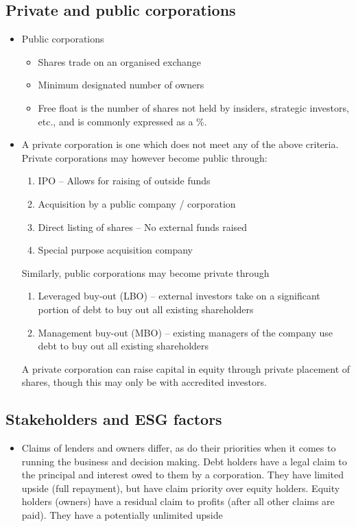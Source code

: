 \documentclass[../notes_compiled.tex]{subfiles}
\begin{document}
\subsection{Private and public corporations}
\begin{itemize}
\item Public corporations
\begin{itemize}
\item Shares trade on an organised exchange
\item Minimum designated number of owners
\item Free float is the number of shares not held by insiders, strategic investors, etc., and is commonly expressed as a \%.
\end{itemize}
\item A private corporation is one which does not meet any of the above criteria. Private corporations may however become public through:
\begin{enumerate}
\item IPO -- Allows for raising of outside funds
\item Acquisition by a public company / corporation
\item Direct listing of shares -- No external funds raised
\item Special purpose acquisition company
\end{enumerate}
Similarly, public corporations may become private through
\begin{enumerate}
\item Leveraged buy-out (LBO) -- external investors take on a significant portion of debt to buy out all existing shareholders
\item Management buy-out (MBO) -- existing managers of the company use debt to buy out all existing shareholders
\end{enumerate}
A private corporation can raise capital in equity through private placement of shares, though this may only be with accredited investors.
\end{itemize}

\subsection{Stakeholders and ESG factors}
\begin{itemize}
\item Claims of lenders and owners differ, as do their priorities when it comes to running the business and decision making. Debt holders have a legal claim to the principal and interest owed to them by a corporation. They have limited upside (full repayment), but have claim priority over equity holders. Equity holders (owners) have a residual claim to profits (after all other claims are paid). They have a potentially unlimited upside
\end{itemize}
\end{document}
